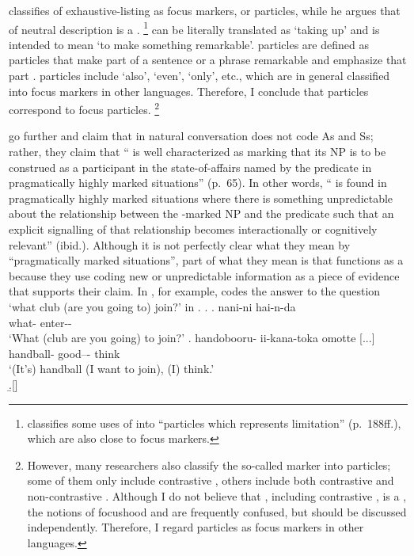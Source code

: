  classifies  of exhaustive-listing as focus markers, or  particles,
while he argues that  of neutral description is a .%
 \footnote{
  classifies some uses of  into ``particles which represents limitation'' (p.~188ff.),
 which are also close to focus markers.
 }
 can be literally translated as `taking up'
and is intended to mean `to make something remarkable'.
 particles are defined as
particles that make part of a sentence or a phrase remarkable and emphasize that part \cite[178]{miyata48}.
 particles include  `also',  `even',
 `only', etc.,
which are in general classified into focus markers in other languages.
Therefore, I conclude that  particles correspond to
focus particles.%
 \footnote{
 However, many researchers also classify the so-called  marker 
  into  particles;
 some of them only include contrastive   \cite{okutsu74,okutsu86,numata86},
 others include both contrastive and non-contrastive 
 \cite{miyata48,suzuki72,teramura81,noda95}.
 Although I do not believe that , including contrastive , is a ,
 the notions of focushood and  are frequently confused,
 but should be discussed independently.
 Therefore, I regard  particles as focus markers
 in other languages.}

 go further and claim that
 in natural conversation does not code As and Ss;
rather, they claim that
`` is well characterized as marking that its NP is to be construed as a participant in the state-of-affairs named by the predicate in pragmatically highly marked situations'' (p.~65).
In other words,
`` is found in pragmatically highly marked situations where
there is something unpredictable about the relationship between
the -marked NP and the predicate such that
an explicit signalling of that relationship becomes interactionally or cognitively relevant'' (ibid.).
Although it is not perfectly clear what they mean by
``pragmatically marked situations'',
part of what they mean is that
 functions as a 
because they use  coding new or unpredictable information
as a piece of evidence that supports their claim.
In \Next[b], for example,
 codes the answer to the question
`what club (are you going to) join?' in \Next[a].
%
\ex.
 \ag. nani-ni hai-n-da \\
      what- enter-- \\
      `What (club are you going) to join?'
 \bg. handobooru- ii-kana-toka omotte [...] \\
      handball- good--- think \\
      `(It's) handball (I want to join), (I) think.' \\
 \b.[]     \hfill{\cite[70]{onoetal00}}


